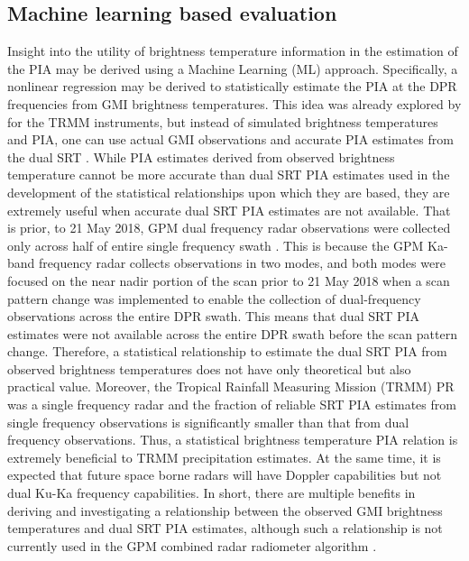 \documentclass[10pt]{ietbook}
\begin{document}
\subsection{Machine learning based evaluation}
Insight into the utility of brightness temperature information in the estimation of the PIA may be derived using a Machine Learning (ML) \cite{geron2022}
approach.  Specifically, a nonlinear regression may be derived to statistically estimate the PIA at the DPR frequencies from GMI brightness temperatures.
This idea was already explored by \cite{smith1997} for the TRMM instruments, but instead of simulated brightness temperatures and PIA, 
one can use actual GMI observations and accurate PIA estimates from the dual SRT \cite{meneghini2015}.  While PIA estimates derived from observed brightness
temperature cannot be more accurate than dual SRT PIA estimates used in the development of the statistical relationships upon which they are based,
they are extremely useful when accurate dual SRT PIA estimates are not available.  That is prior, to 21 May 2018, GPM dual frequency radar observations were
collected only across half of entire single frequency swath \cite{seto2021}.  This is because the GPM Ka-band frequency radar collects observations in two modes,
and both modes were focused on the near nadir portion of the scan prior to 21 May 2018 when a scan pattern change was implemented to enable the collection of 
dual-frequency observations across the entire DPR swath. This means that dual SRT PIA estimates were not available across the entire DPR swath before the
scan pattern change.  Therefore, a statistical relationship to estimate the dual SRT PIA from observed brightness temperatures 
does not have only theoretical but also practical value.  Moreover, the Tropical Rainfall Measuring Mission (TRMM)  PR was a single frequency radar \cite{kummerow1998}
and the fraction  of reliable SRT PIA estimates from single frequency observations is significantly smaller than that from dual frequency observations. Thus, a statistical 
brightness temperature PIA relation is extremely beneficial to TRMM precipitation estimates.  At the same time, it is expected that future space borne radars
will have Doppler capabilities but not dual Ku-Ka frequency capabilities. In short, there are multiple benefits in deriving and investigating a relationship
between the observed GMI brightness temperatures and dual SRT PIA estimates, although such a relationship is not currently used in the GPM combined radar radiometer
algorithm \cite{grecu2016}.
\end{document}
